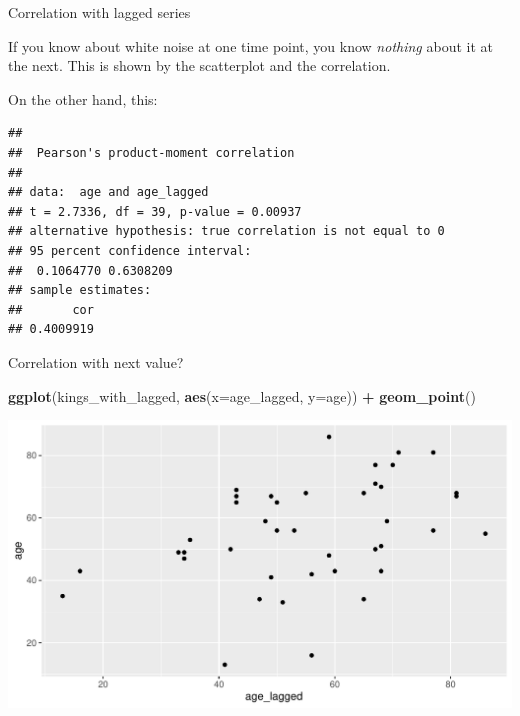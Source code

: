 \documentclass[ignorenonframetext,]{beamer}
\newenvironment{Shaded}{\begin{snugshade}}{\end{snugshade}}
\newcommand{\DataTypeTok}[1]{\textcolor[rgb]{0.13,0.29,0.53}{#1}}
\newcommand{\KeywordTok}[1]{\textcolor[rgb]{0.13,0.29,0.53}{\textbf{#1}}}
\newcommand{\NormalTok}[1]{#1}
\newcommand{\OperatorTok}[1]{\textcolor[rgb]{0.81,0.36,0.00}{\textbf{#1}}}
\newcommand{\StringTok}[1]{\textcolor[rgb]{0.31,0.60,0.02}{#1}}
\begin{document}
\begin{frame}[fragile]{Correlation with lagged series}
\protect\hypertarget{correlation-with-lagged-series}{}

If you know about white noise at one time point, you know \emph{nothing}
about it at the next. This is shown by the scatterplot and the
correlation.

On the other hand, this:

\footnotesize

\begin{Shaded}
\end{Shaded}

\begin{verbatim}
## 
##  Pearson's product-moment correlation
## 
## data:  age and age_lagged
## t = 2.7336, df = 39, p-value = 0.00937
## alternative hypothesis: true correlation is not equal to 0
## 95 percent confidence interval:
##  0.1064770 0.6308209
## sample estimates:
##       cor 
## 0.4009919
\end{verbatim}

\normalsize

\end{frame}

\begin{frame}[fragile]{Correlation with next value?}
\protect\hypertarget{correlation-with-next-value}{}

\begin{Shaded}
\begin{Highlighting}[]
\KeywordTok{ggplot}\NormalTok{(kings_with_lagged, }\KeywordTok{aes}\NormalTok{(}\DataTypeTok{x=}\NormalTok{age_lagged, }\DataTypeTok{y=}\NormalTok{age)) }\OperatorTok{+}\StringTok{ }
\StringTok{  }\KeywordTok{geom_point}\NormalTok{()}
\end{Highlighting}
\end{Shaded}

\includegraphics{figure/unnamed-chunk-583-1.pdf}

\end{frame}
\end{document}
